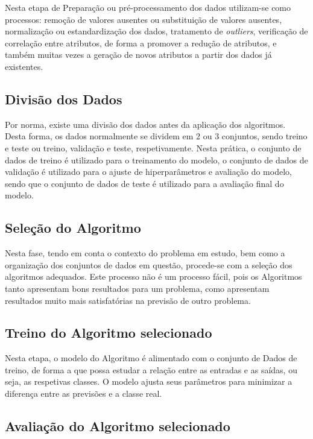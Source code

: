 \documentclass[12pt,a4paper,twoside]{report}
\begin{document}
{Nesta etapa de Preparação ou pré-processamento dos dados utilizam-se como processos: remoção de valores ausentes ou substituição de valores ausentes, normalização ou estandardização dos dados, tratamento de \textit{outliers}, verificação de correlação entre atributos, de forma a promover a redução de atributos, e também muitas vezes a geração de novos atributos a partir dos dados já existentes.

\subsection{Divisão dos Dados}

Por norma, existe uma divisão dos dados antes da aplicação dos algoritmos. Desta forma, os dados normalmente se dividem em 2 ou 3 conjuntos, sendo treino e teste ou treino, validação e teste, respetivamente. Nesta prática, o conjunto de dados de treino é utilizado para o treinamento do modelo, o conjunto de dados de validação é utilizado para o ajuste de hiperparâmetros e avaliação do modelo, sendo que o conjunto de dados de teste é utilizado para a avaliação final do modelo. 

\subsection{Seleção do Algoritmo}

Nesta fase, tendo em conta o contexto do problema em estudo, bem como a organização dos conjuntos de dados em questão, procede-se com a seleção dos algoritmos adequados. Este processo não é um processo fácil, pois os Algoritmos tanto apresentam bons resultados para um problema, como apresentam resultados muito mais satisfatórias na previsão de outro problema.

\subsection{Treino do Algoritmo selecionado}

Nesta etapa, o modelo do Algoritmo é alimentado com o conjunto de Dados de treino, de forma a que possa estudar a relação entre as entradas e as saídas, ou seja, as respetivas classes. O modelo ajusta seus parâmetros para minimizar a diferença entre as previsões e a classe real.

\subsection{Avaliação do Algoritmo selecionado}

}
\end{document}
